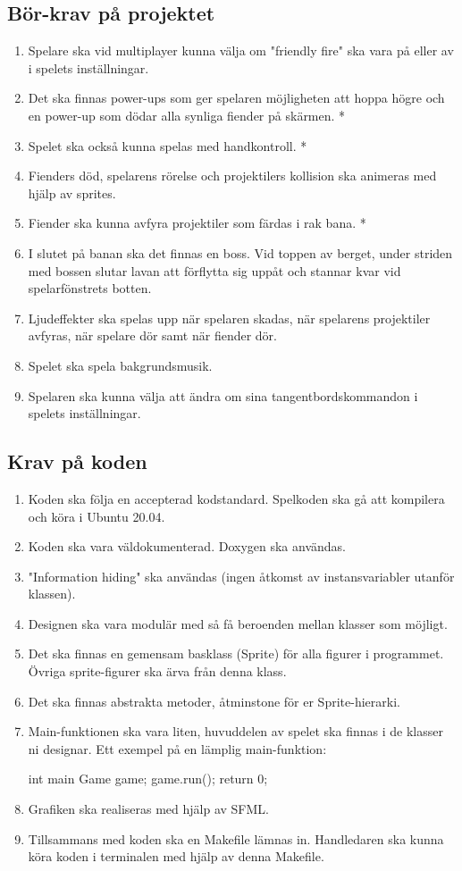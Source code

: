 \documentclass{TDP005mall}
\begin{document}
\subsection{Bör-krav på projektet}
\begin{enumerate}
\item Spelare ska vid multiplayer kunna välja om "friendly fire" ska vara på eller av i spelets inställningar. 
\item Det ska finnas power-ups som ger spelaren möjligheten att hoppa högre och en power-up som dödar alla synliga fiender på skärmen. *
\item Spelet ska också kunna spelas med handkontroll. *
\item Fienders död, spelarens rörelse och projektilers kollision ska animeras med hjälp av sprites.
\item Fiender ska kunna avfyra projektiler som färdas i rak bana. *
\item I slutet på banan ska det finnas en boss. Vid toppen av berget, under striden med bossen slutar lavan att förflytta sig uppåt och stannar kvar vid spelarfönstrets botten.
\item Ljudeffekter ska spelas upp när spelaren skadas, när spelarens projektiler avfyras, när spelare dör samt när fiender dör.
\item Spelet ska spela bakgrundsmusik.
\item Spelaren ska kunna välja att ändra om sina tangentbordskommandon i spelets inställningar.
\end{enumerate}

\subsection{Krav på koden}
\begin{enumerate}
\item    Koden ska följa en accepterad kodstandard. Spelkoden ska gå att kompilera och köra i Ubuntu 20.04.
\item    Koden ska vara väldokumenterad. Doxygen ska användas.
\item    "Information hiding" ska användas (ingen åtkomst av instansvariabler utanför klassen).
\item    Designen ska vara modulär med så få beroenden mellan klasser som möjligt.
\item    Det ska finnas en gemensam basklass (Sprite) för alla figurer i programmet. Övriga sprite-figurer ska ärva från denna klass.
\item    Det ska finnas abstrakta metoder, åtminstone för er Sprite-hierarki.
\item    Main-funktionen ska vara liten, huvuddelen av spelet ska finnas i de klasser ni designar. Ett exempel på en lämplig main-funktion:

    int main {
       Game game;
       game.run();
       return 0;
    }
        

\item    Grafiken ska realiseras med hjälp av SFML.
\item    Tillsammans med koden ska en Makefile lämnas in. Handledaren ska kunna köra koden i terminalen med hjälp av denna Makefile.
\end{enumerate}
\end{document}
